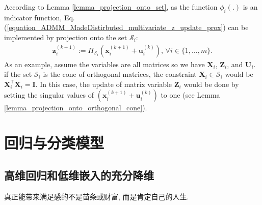 \documentclass[lang=cn,10pt]{gorgeousnbook}
\numberwithin{equation}{section}%
\numberwithin{figure}{section}%
\begin{document}
According to Lemma \ref{lemma_projection_onto_set}, as the function $\phi_i(.)$ is an indicator function, Eq. (\ref{equation_ADMM_MadeDistirbuted_multivariate_z_update_prox}) can be implemented by projection onto the set $\mathcal{S}_i$:
\begin{align*}
\boldsymbol{z}_i^{(k+1)} := \Pi_{\mathcal{S}_i}(\boldsymbol{x}_i^{(k+1)} + \boldsymbol{u}_i^{(k)}),\, \forall i \in \{1, \dots, m\}.
\end{align*}
As an example, assume the variables are all matrices so we have $\boldsymbol{X}_i$, $\boldsymbol{Z}_i$, and $\boldsymbol{U}_i$.
if the set $\mathcal{S}_i$ is the cone of orthogonal matrices, the constraint $\boldsymbol{X}_i \in \mathcal{S}_i$ would be $\boldsymbol{X}_i^\top \boldsymbol{X}_i = \boldsymbol{I}$. In this case, the update of matrix variable $\boldsymbol{Z}_i$ would be done by setting the singular values of $(\boldsymbol{x}_i^{(k+1)} + \boldsymbol{u}_i^{(k)})$ to one (see Lemma \ref{lemma_projection_onto_orthogonal_cone}). 



\mainmatter
{}
\part{回归与分类模型}



\chapter{高维回归和低维嵌入的充分降维}
\vspace{0.5in}
\begin{center}
    \textcolor[RGB]{255, 0, 0}{\faHeart}真正能带来满足感的不是苗条或财富, 而是肯定自己的人生.\textcolor[RGB]{255, 0, 0}{\faHeart}
\end{center}

\begin{center}
\end{center}
\end{document}
